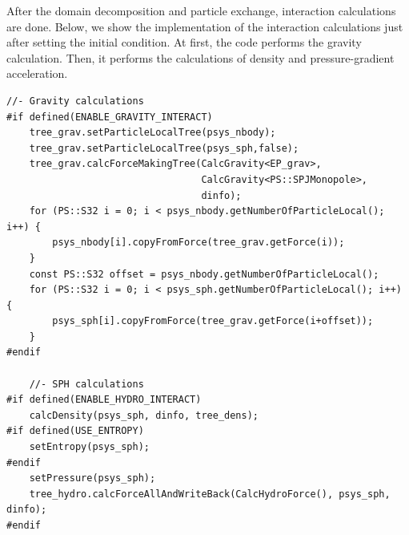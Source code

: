 After the domain decomposition and particle exchange, interaction calculations are done. Below, we show the implementation of the interaction calculations just after setting the initial condition. At first, the code performs the gravity calculation. Then, it performs the calculations of density and pressure-gradient acceleration.

\ifCpp %
\begin{lstlisting}[caption=Interaction calculations]
    //- Gravity calculations
#if defined(ENABLE_GRAVITY_INTERACT)
    tree_grav.setParticleLocalTree(psys_nbody);
    tree_grav.setParticleLocalTree(psys_sph,false);
    tree_grav.calcForceMakingTree(CalcGravity<EP_grav>,
                                  CalcGravity<PS::SPJMonopole>,
                                  dinfo);
    for (PS::S32 i = 0; i < psys_nbody.getNumberOfParticleLocal(); i++) {
        psys_nbody[i].copyFromForce(tree_grav.getForce(i));
    }
    const PS::S32 offset = psys_nbody.getNumberOfParticleLocal();
    for (PS::S32 i = 0; i < psys_sph.getNumberOfParticleLocal(); i++) {
        psys_sph[i].copyFromForce(tree_grav.getForce(i+offset));
    }
#endif

    //- SPH calculations
#if defined(ENABLE_HYDRO_INTERACT)
    calcDensity(psys_sph, dinfo, tree_dens);
#if defined(USE_ENTROPY)
    setEntropy(psys_sph);
#endif
    setPressure(psys_sph);
    tree_hydro.calcForceAllAndWriteBack(CalcHydroForce(), psys_sph, dinfo);
#endif
\end{lstlisting}
\endifCpp
\ifFtn %
